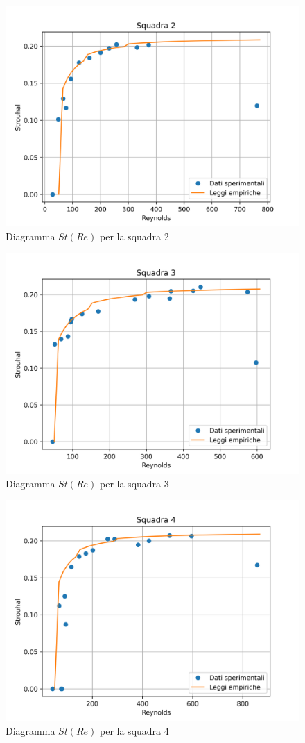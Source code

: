 \begin{figure}[H]
    \centering
    \includegraphics[width=.85\textwidth]{images/10/sq2adim.png}
    \caption{Diagramma $St(Re)$ per la squadra 2}
\end{figure}
\begin{figure}[H]
    \centering
    \includegraphics[width=.85\textwidth]{images/10/sq3adim.png}
    \caption{Diagramma $St(Re)$ per la squadra 3}
\end{figure}
\begin{figure}[H]
    \centering
    \includegraphics[width=.85\textwidth]{images/10/sq4adim.png}
    \caption{Diagramma $St(Re)$ per la squadra 4}
\end{figure}

